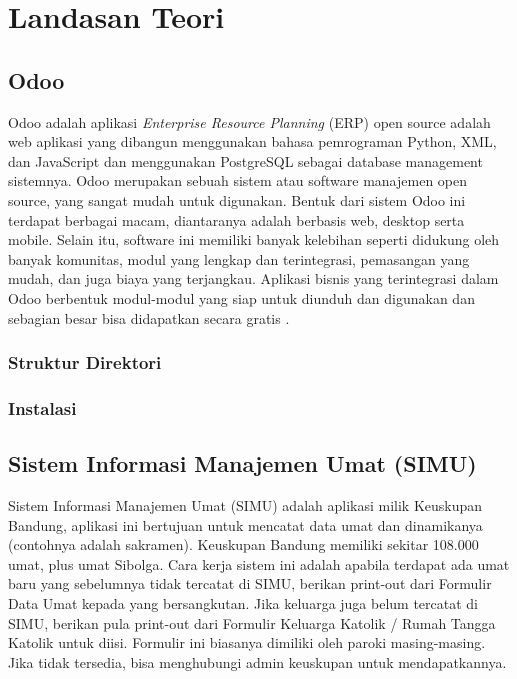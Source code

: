 \chapter{Landasan Teori}
\label{sec:landasanteori}

\section{Odoo}
\label{sec:odoo}

Odoo adalah aplikasi \textit{Enterprise Resource Planning} (ERP) open source adalah web aplikasi yang dibangun menggunakan bahasa pemrograman Python, XML, dan JavaScript dan menggunakan PostgreSQL sebagai database management sistemnya.  Odoo merupakan sebuah sistem atau software manajemen open source, yang sangat mudah untuk digunakan. Bentuk dari sistem Odoo ini terdapat berbagai macam, diantaranya adalah berbasis web, desktop serta mobile. Selain itu, software ini memiliki banyak kelebihan seperti didukung oleh banyak komunitas, modul yang lengkap dan terintegrasi, pemasangan yang mudah, dan juga biaya yang terjangkau. Aplikasi bisnis yang terintegrasi dalam Odoo berbentuk modul-modul yang siap untuk diunduh dan digunakan dan sebagian besar bisa didapatkan secara gratis \cite{suminten}.

\subsection{Struktur Direktori}
\label{sec:strukturDirektori}

\subsection{Instalasi}
\label{sec:instalasi}

\section{Sistem Informasi Manajemen Umat (SIMU)}
\label{sec:simu}
Sistem Informasi Manajemen Umat (SIMU) adalah aplikasi milik Keuskupan Bandung, aplikasi ini bertujuan untuk mencatat data umat dan dinamikanya (contohnya adalah sakramen). Keuskupan Bandung memiliki sekitar 108.000 umat, plus umat Sibolga. Cara kerja sistem ini adalah apabila terdapat ada umat baru yang sebelumnya tidak tercatat di SIMU, berikan print-out dari Formulir Data Umat kepada yang bersangkutan. Jika keluarga juga belum tercatat di SIMU, berikan pula print-out dari Formulir Keluarga Katolik / Rumah Tangga Katolik untuk diisi. Formulir ini biasanya dimiliki oleh paroki masing-masing. Jika tidak tersedia, bisa menghubungi admin keuskupan untuk mendapatkannya.


